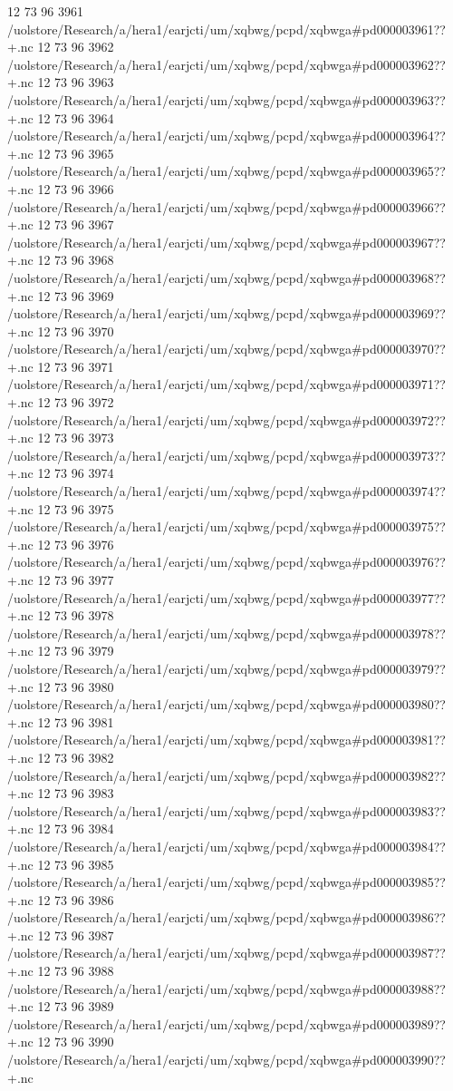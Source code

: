 12 73 96
3961
/uolstore/Research/a/hera1/earjcti/um/xqbwg/pcpd/xqbwga#pd000003961??+.nc
12 73 96
3962
/uolstore/Research/a/hera1/earjcti/um/xqbwg/pcpd/xqbwga#pd000003962??+.nc
12 73 96
3963
/uolstore/Research/a/hera1/earjcti/um/xqbwg/pcpd/xqbwga#pd000003963??+.nc
12 73 96
3964
/uolstore/Research/a/hera1/earjcti/um/xqbwg/pcpd/xqbwga#pd000003964??+.nc
12 73 96
3965
/uolstore/Research/a/hera1/earjcti/um/xqbwg/pcpd/xqbwga#pd000003965??+.nc
12 73 96
3966
/uolstore/Research/a/hera1/earjcti/um/xqbwg/pcpd/xqbwga#pd000003966??+.nc
12 73 96
3967
/uolstore/Research/a/hera1/earjcti/um/xqbwg/pcpd/xqbwga#pd000003967??+.nc
12 73 96
3968
/uolstore/Research/a/hera1/earjcti/um/xqbwg/pcpd/xqbwga#pd000003968??+.nc
12 73 96
3969
/uolstore/Research/a/hera1/earjcti/um/xqbwg/pcpd/xqbwga#pd000003969??+.nc
12 73 96
3970
/uolstore/Research/a/hera1/earjcti/um/xqbwg/pcpd/xqbwga#pd000003970??+.nc
12 73 96
3971
/uolstore/Research/a/hera1/earjcti/um/xqbwg/pcpd/xqbwga#pd000003971??+.nc
12 73 96
3972
/uolstore/Research/a/hera1/earjcti/um/xqbwg/pcpd/xqbwga#pd000003972??+.nc
12 73 96
3973
/uolstore/Research/a/hera1/earjcti/um/xqbwg/pcpd/xqbwga#pd000003973??+.nc
12 73 96
3974
/uolstore/Research/a/hera1/earjcti/um/xqbwg/pcpd/xqbwga#pd000003974??+.nc
12 73 96
3975
/uolstore/Research/a/hera1/earjcti/um/xqbwg/pcpd/xqbwga#pd000003975??+.nc
12 73 96
3976
/uolstore/Research/a/hera1/earjcti/um/xqbwg/pcpd/xqbwga#pd000003976??+.nc
12 73 96
3977
/uolstore/Research/a/hera1/earjcti/um/xqbwg/pcpd/xqbwga#pd000003977??+.nc
12 73 96
3978
/uolstore/Research/a/hera1/earjcti/um/xqbwg/pcpd/xqbwga#pd000003978??+.nc
12 73 96
3979
/uolstore/Research/a/hera1/earjcti/um/xqbwg/pcpd/xqbwga#pd000003979??+.nc
12 73 96
3980
/uolstore/Research/a/hera1/earjcti/um/xqbwg/pcpd/xqbwga#pd000003980??+.nc
12 73 96
3981
/uolstore/Research/a/hera1/earjcti/um/xqbwg/pcpd/xqbwga#pd000003981??+.nc
12 73 96
3982
/uolstore/Research/a/hera1/earjcti/um/xqbwg/pcpd/xqbwga#pd000003982??+.nc
12 73 96
3983
/uolstore/Research/a/hera1/earjcti/um/xqbwg/pcpd/xqbwga#pd000003983??+.nc
12 73 96
3984
/uolstore/Research/a/hera1/earjcti/um/xqbwg/pcpd/xqbwga#pd000003984??+.nc
12 73 96
3985
/uolstore/Research/a/hera1/earjcti/um/xqbwg/pcpd/xqbwga#pd000003985??+.nc
12 73 96
3986
/uolstore/Research/a/hera1/earjcti/um/xqbwg/pcpd/xqbwga#pd000003986??+.nc
12 73 96
3987
/uolstore/Research/a/hera1/earjcti/um/xqbwg/pcpd/xqbwga#pd000003987??+.nc
12 73 96
3988
/uolstore/Research/a/hera1/earjcti/um/xqbwg/pcpd/xqbwga#pd000003988??+.nc
12 73 96
3989
/uolstore/Research/a/hera1/earjcti/um/xqbwg/pcpd/xqbwga#pd000003989??+.nc
12 73 96
3990
/uolstore/Research/a/hera1/earjcti/um/xqbwg/pcpd/xqbwga#pd000003990??+.nc
